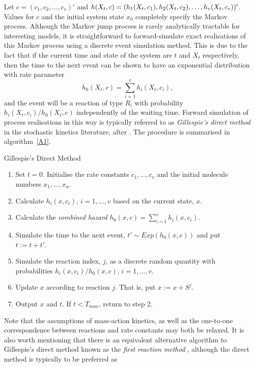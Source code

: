 \documentclass[12pt, DIV12]{scrartcl}
\begin{document}
Let $c=(c_1,c_2,\ldots,c_v)'$ and
$h(X_t,c)=(h_1(X_t,c_1),h_2(X_t,c_2),\ldots,\linebreak[0] h_v(X_t,c_v))'$.
Values for $c$ and the initial system state $x_0$ completely specify the Markov
process. Although the Markov jump process is rarely analytically tractable for
interesting models, it is straightforward to forward-simulate exact realisations
of this Markov process using a discrete event simulation method. This is due to
the fact that if the current time and state of the system are $t$ and $X_t$
respectively, then the time to the next event can be shown to have an
exponential distribution with rate parameter
\[
h_0(X_t,c)=\sum_{i=1}^v h_i(X_t,c_i),
\]
and the event will be a reaction of type $R_i$ with probability
$h_i(X_t,c_i)/h_0(X_t,c)$ independently of the waiting time. Forward simulation
of process realisations in this way is typically referred to as
\emph{Gillespie's direct method} in the stochastic kinetics literature, after
\cite{Gillespie77}. The procedure is summarised in algorithm~\ref{A1}. 
\begin{algorithm}[t]
\caption{Gillespie's Direct Method}\label{A1}
\begin{enumerate}
\item Set $t=0$. Initialise the rate constants $c_{1},\ldots ,c_{v}$ 
and the initial molecule numbers $x_{1},\ldots ,x_{u}$.
\item Calculate $h_{i}(x,c_{i})$, $i=1,\ldots ,v$ based on the current state, $x$.
\item Calculate the \emph{combined hazard} $h_{0}(x,c)=\sum_{i=1}^v h_i(x,c_i)$.
\item Simulate the time to the next event, $t'\sim Exp(h_{0}(x,c))$ and put $t:=t+t'$.
\item Simulate the reaction index, $j$, as a discrete random quantity with
  probabilities $h_{i}(x,c_{i})/h_{0}(x,c)$, $i=1,\ldots ,v$.
\item Update $x$ according to reaction $j$. That is, put $x:=x+S^{j}$.
\item Output $x$ and $t$. If $t< T_{max}$, return to step 2.
\end{enumerate}
\end{algorithm}
Note that the assumptions of mass-action kinetics, as well as the one-to-one
correspondence between reactions and rate constants may both be relaxed. It is
also worth mentioning that there is an equivalent alternative algorithm to
Gillespie's direct method known as the \emph{first reaction method}
\citep{Gillespie76}, although the direct method is typically to be preferred as
\end{document}
